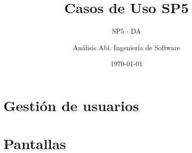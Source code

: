 \documentclass[10pt]{report}
\title{Casos de Uso SP5}
\subtitle{SP5 - DA}
\author{Análisis Abi. Ingeniería de Software}
\date{\today}
\begin{document}
\maketitle
\thispagestyle{empty}
\tableofcontents





\chapter{Gestión de usuarios}

%



%
\chapter{Pantallas}

\end{document}
